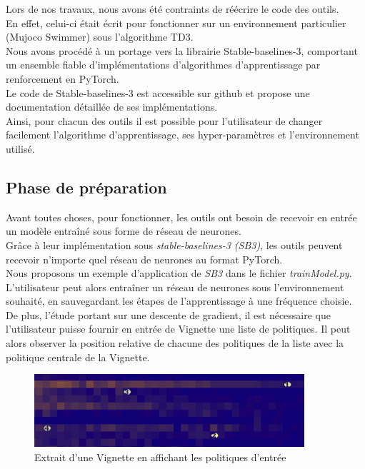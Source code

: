 \documentclass[12pt]{article}
\begin{document}
Lors de nos travaux, nous avons été contraints de réécrire le code des outils. \\

En effet, celui-ci était écrit pour fonctionner sur un environnement particulier (Mujoco Swimmer) sous l’algorithme TD3. \\

Nous avons procédé à un portage vers la librairie Stable-baselines-3, comportant un ensemble fiable d’implémentations d’algorithmes d’apprentissage par renforcement en PyTorch. \\

Le code de Stable-baselines-3 est accessible sur github et propose une documentation détaillée de ses implémentations. \\

Ainsi, pour chacun des outils il est possible pour l’utilisateur de changer facilement l’algorithme d’apprentissage, ses hyper-paramètres et l’environnement utilisé. \\

\subsection{Phase de préparation}

Avant toutes choses, pour fonctionner, les outils ont besoin de recevoir en entrée un modèle entraîné sous forme de réseau de neurones. \\

Grâce à leur implémentation sous \emph{stable-baselines-3 (SB3)}, les outils peuvent recevoir n'importe quel réseau de neurones au format PyTorch. \\

Nous proposons un exemple d'application de \emph{SB3} dans le fichier \emph{trainModel.py}. L'utilisateur peut alors entraîner un réseau de neurones sous l'environnement souhaité, en sauvegardant les étapes de l'apprentissage à une fréquence choisie. \\

De plus, l'étude portant sur une descente de gradient, il est nécessaire que l'utilisateur puisse fournir en entrée de Vignette une liste de politiques. Il peut alors observer la position relative de chacune des politiques de la liste avec la politique centrale de la Vignette. \\

\begin{figure}[htp]
    \centering
    \includegraphics[width=10cm]{Images/politiques_entrees_vignette}
    \caption{Extrait d'une Vignette en affichant les politiques d'entrée}
    \label{fig:exempleEntree}
\end{figure}
\end{document}
